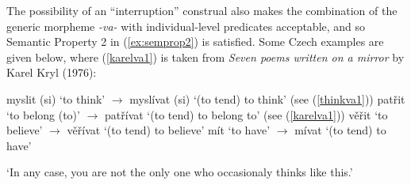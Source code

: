 \documentclass[output=paper,colorlinks,citecolor=brown]{langscibook}
\begin{document}
\ea
{}
\z \z

\noindent The possibility of an ``interruption'' construal
also makes the combination of the  generic morpheme \textit{-va-} with individual-level predicates acceptable,
and so Semantic Property 2 in (\ref{ex:semprop2}) is satisfied.
Some Czech examples are given below, where
(\ref{karelva1}) is taken from
\textit{Seven poems written on a mirror} by Karel Kryl (1976):

\ea\label{ex:genILP}
\ea myslit (si) `to think' $\rightarrow$ myslívat (si) `(to tend) to think' (see (\ref{thinkva1}))
\ex patřit `to belong (to)' $\rightarrow$  patřívat	 `(to tend) to belong to' (see (\ref{karelva1}))
\ex věřit `to believe'  $\rightarrow$ věřívat	`(to tend) to believe'
\ex mít	`to have' $\rightarrow$ mívat  `(to tend) to have'
\z
\z

\ea
{}
\glt `In any case, you are not the only one who occasionaly thinks like this.’
\z
\z
\end{document}
